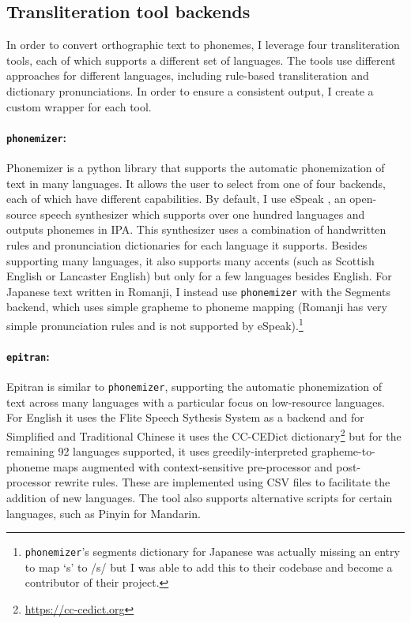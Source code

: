 \subsection{Transliteration tool backends}
\label{sec:dataset-transliteration-tool-backends}

In order to convert orthographic text to phonemes, I leverage four transliteration tools, each of which supports a different set of languages. The tools use different approaches for different languages, including rule-based transliteration and dictionary pronunciations. In order to ensure a consistent output, I create a custom wrapper for each tool.

\paragraph{\texttt{phonemizer}:}
Phonemizer \citep{Bernard2021} is a python library that supports the automatic phonemization of text in many languages. It allows the user to select from one of four backends, each of which have different capabilities. By default, I use eSpeak \citep{Dunn2019}, an open-source speech synthesizer which supports over one hundred languages and outputs phonemes in IPA. This synthesizer uses a combination of handwritten rules and pronunciation dictionaries for each language it supports. Besides supporting many languages, it also supports many accents (such as Scottish English or Lancaster English) but only for a few languages besides English. For Japanese text written in Romanji, I instead use \texttt{phonemizer} with the Segments \citep{robert_forkel_2019_3549784} backend, which uses simple grapheme to phoneme mapping (Romanji has very simple pronunciation rules and is not supported by eSpeak).\footnote{\texttt{phonemizer}'s segments dictionary for Japanese was actually missing an entry to map `s' to /s/ but I was able to add this to their codebase and become a contributor of their project.}

\paragraph{\texttt{epitran}:}
Epitran \citep{Mortensen-et-al:2018} is similar to \texttt{phonemizer}, supporting the automatic phonemization of text across many languages with a particular focus on low-resource languages. For English it uses the Flite Speech Sythesis System \citep{black2001flite} as a backend and for Simplified and Traditional Chinese it uses the CC-CEDict dictionary\footnote{\url{https://cc-cedict.org}} but for the remaining 92 languages supported, it uses greedily-interpreted grapheme-to-phoneme maps augmented with context-sensitive pre-processor and post-processor rewrite rules. These are implemented using CSV files to facilitate the addition of new languages. The tool also supports alternative scripts for certain languages, such as Pinyin for Mandarin.

